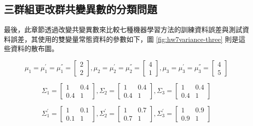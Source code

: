 \subsection{三群組更改群共變異數的分類問題}

最後，此章節透過改變共變異數來比較七種機器學習方法的訓練資料誤差與測試資料誤差，其使用的雙變量常態資料的參數如下，圖 \ref{fig:hw7variance-three} 則是這些資料的散布圖。

$$ \mu_1=\mu_1^{'}=\mu_1^{''} = \left[
            \begin{array}{clr}
                2  \\
                2 
            \end{array} \right] ,
            \mu_2=\mu_2^{'} =\mu_2^{''}= \left[
            \begin{array}{clr}
                4  \\
                1 
            \end{array} \right],
            \mu_3=\mu_3^{'}=\mu_3^{''} = \left[
            \begin{array}{clr}
                4  \\
                5 
            \end{array} \right]$$ 

$$ \Sigma_1 = \left[
            \begin{array}{clr}
                1 & 0.4  \\
                0.4 & 1
            \end{array} \right] ,
            \Sigma_2 = \left[
            \begin{array}{clr}
                1 & 0.4  \\
                0.4 & 1 
            \end{array} \right]  ,
            \Sigma_3 = \left[
            \begin{array}{clr}
                1 & 0.4  \\
                0.4 & 1 
            \end{array} \right] $$

$$ \Sigma_1^{'} = \left[
            \begin{array}{clr}
                1 & 0.1  \\
                0.1 & 1
            \end{array} \right] ,
            \Sigma_2^{'} = \left[
            \begin{array}{clr}
                1 & 0.7  \\
                0.7 & 1 
            \end{array} \right]  ,
            \Sigma_3^{'} = \left[
            \begin{array}{clr}
                1 & 0.9  \\
                0.9 & 1 
            \end{array} \right] $$


